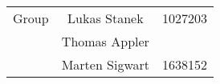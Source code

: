 \documentclass{article}
\begin{document}
%
\author{ML Exercise 2 - Group 19}
%
%

\maketitle
\begin{center}
\begin{tabular}{l| c r}
Group & Lukas Stanek & 1027203 \\ %
& Thomas Appler \\
& Marten Sigwart & 1638152 \\
\end{tabular}
\end{center}
\end{document}
